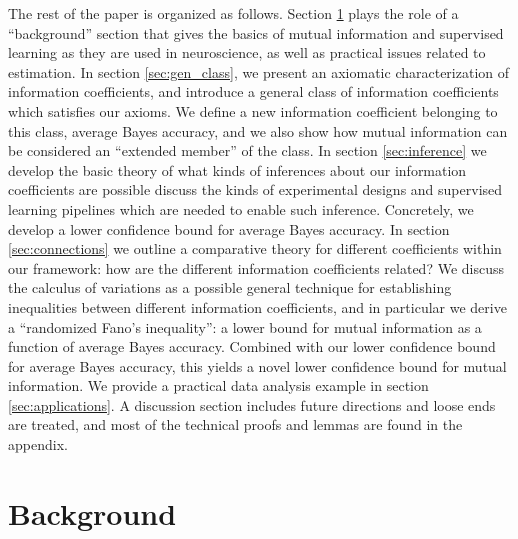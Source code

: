 \documentclass[12pt]{article}
\begin{document}
The rest of the paper is organized as follows.  Section \ref{sec:info}
plays the role of a ``background'' section that gives the basics of
mutual information and supervised learning as they are used in
neuroscience, as well as practical issues related to estimation.  In
section \ref{sec:gen_class}, we present an axiomatic characterization
of information coefficients, and introduce a general class of information
coefficients which satisfies our axioms.  We define a new information
coefficient belonging to this class, average Bayes accuracy, and we also
show how mutual information can be considered an ``extended member''
of the class.  In section \ref{sec:inference} we develop the basic
theory of what kinds of inferences about our information coefficients are
possible discuss the kinds of experimental designs and supervised
learning pipelines which are needed to enable such inference.
Concretely, we develop a lower confidence bound for average Bayes
accuracy. In section \ref{sec:connections} we outline a comparative
theory for different coefficients within our framework: how are the
different information coefficients related?  We discuss the calculus of
variations as a possible general technique for establishing
inequalities between different information coefficients, and in particular
we derive a ``randomized Fano's inequality'': a lower bound for mutual
information as a function of average Bayes accuracy.  Combined with
our lower confidence bound for average Bayes accuracy, this yields a
novel lower confidence bound for mutual information.  We provide a
practical data analysis example in section \ref{sec:applications}.  A
discussion section includes future directions and loose ends are
treated, and most of the technical proofs and lemmas are found in the
appendix.

\section{Background}\label{sec:info}
\end{document}
